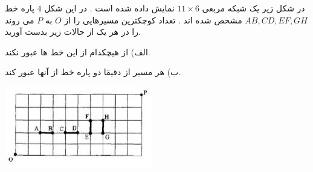 \exercise
در شکل زیر یک شبکه مربعی 
$11 \times 6$
نمایش داده شده است . در این شکل 
$4$
 پاره خط 
$AB, CD, EF, GH$
  مشخص شده اند . تعداد کوچکترین مسیرهایی را از 
$O$
  به 
$P$
   می روند را در هر یک از
حالات زیر بدست آورید.

الف) از هیچکدام از این خط ها عبور نکند.

ب) هر مسیر از دقیقا دو پاره خط از آنها عبور کند.

    \begin{center}
     	\includegraphics[scale=0.7]{./5.png}
    \end{center}